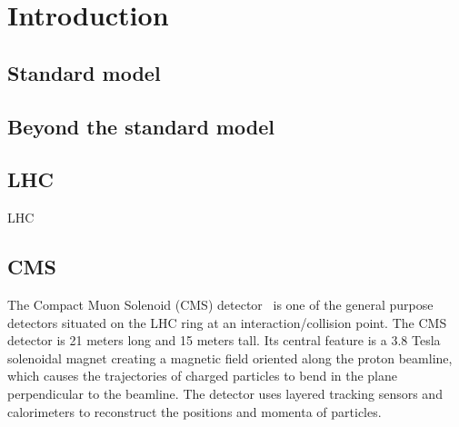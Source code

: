 \chapter{Introduction}


\section{Standard model}


\section{Beyond the standard model}


\section{LHC}


LHC~\cite{LHC:Evans1129806}



\section{CMS}


The Compact Muon Solenoid (CMS)
detector~\cite{CMS:Chatrchyan2008zzk,CMS:PTDR2} is one of the general purpose
detectors situated on the LHC ring at an interaction/collision point. 
The CMS detector is 21 meters long and 15 meters tall. Its central feature
is a 3.8 Tesla solenoidal magnet creating a magnetic field oriented along the proton 
beamline, which causes the trajectories of charged particles to bend in the plane
perpendicular to the beamline.
The detector uses layered tracking sensors and calorimeters to reconstruct the
positions and momenta of particles.

